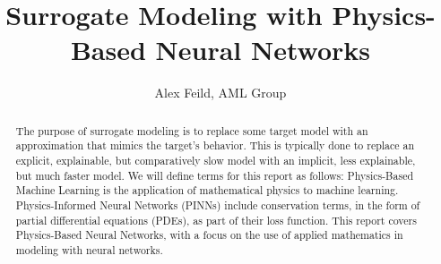 \documentclass[]{article}
\title{Surrogate Modeling with Physics-Based Neural Networks}
\author{Alex Feild, AML Group}
\begin{document}
\maketitle

\begin{abstract}
The purpose of surrogate modeling is to replace some target model with an approximation that mimics the target's behavior.  This is typically done to replace an explicit, explainable, but comparatively slow model with an implicit, less explainable, but much faster model.  We will define terms for this report as follows:  Physics-Based Machine Learning is the application of mathematical physics to machine learning.  Physics-Informed Neural Networks (PINNs) include conservation terms, in the form of partial differential equations (PDEs), as part of their loss function.  This report covers Physics-Based Neural Networks, with a focus on the use of applied mathematics in modeling with neural networks.  

\end{abstract}
\end{document}
